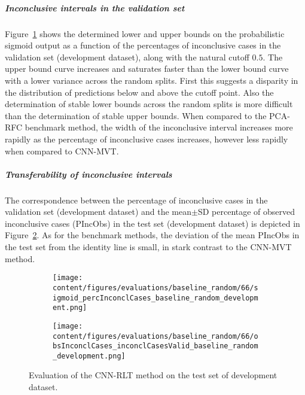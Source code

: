 \subparagraph{Inconclusive intervals in the validation set}

Figure~\ref{fig:baseline_random_percInconclCases_development} shows the determined lower and upper bounds on the 
probabilistic sigmoid output as a function of the percentages of inconclusive cases 
in the validation set (development dataset), along with the natural cutoff $0.5$.
The upper bound curve increases and saturates faster than the lower bound curve with a lower variance across 
the random splits.
First this suggests a disparity in the distribution of predictions below and above the cutoff point.
Also the determination of stable lower bounds across the random splits is more difficult
than the determination of stable upper bounds.
When compared to the PCA-RFC benchmark method, 
the width of the inconclusive interval increases more rapidly as the percentage of inconclusive cases increases, 
however less rapidly when compared to CNN-MVT.

\subparagraph{Transferability of inconclusive intervals}

The correspondence between the percentage of inconclusive cases in the validation set (development dataset) and 
the mean$\pm$SD percentage of observed inconclusive cases (PIncObs) in the test set (development dataset) 
is depicted in Figure~\ref{fig:obsInconclCases_inconclCasesValid_baseline_random_development}.
As for the benchmark methods, the deviation of the mean PIncObs in the test set from the 
identity line is small, in stark contrast to the CNN-MVT method.


\begin{figure}[ht]
  \begin{subfigure}{0.48\textwidth}
    \centering
    \texttt{[image: content/figures/evaluations/baseline\_random/66/sigmoid\_percInconclCases\_baseline\_random\_development.png]}
    \label{fig:baseline_random_percInconclCases_development}
  \end{subfigure}
  \hfill
  \begin{subfigure}{0.495\textwidth}
    \centering
    \texttt{[image: content/figures/evaluations/baseline\_random/66/obsInconclCases\_inconclCasesValid\_baseline\_random\_development.png]}
    \label{fig:obsInconclCases_inconclCasesValid_baseline_random_development}
  \end{subfigure}

  \caption{Evaluation of the CNN-RLT method on the test set of development dataset.}
  \label{fig:eval_cnn_rlt_dev}
\end{figure}


